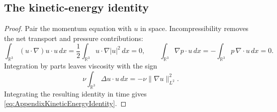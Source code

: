 \subsection{The kinetic-energy identity}

\begin{proof}
Pair the momentum equation with \(u\) in space.  Incompressibility removes
the net transport and pressure contributions:
\[
  \int_{\mathbb R^3}(u\cdot\nabla)u\cdot u\,dx
  =
  \frac12\int_{\mathbb R^3}u\cdot\nabla|u|^2\,dx
  =0,
  \qquad
  \int_{\mathbb R^3}\nabla p\cdot u\,dx
  =-
  \int_{\mathbb R^3}p\,\nabla\cdot u\,dx
  =0.
\]
Integration by parts leaves viscosity with the sign
\[
  \nu\int_{\mathbb R^3}\Delta u\cdot u\,dx
  =-\nu\lVert\nabla u\rVert_{L^2}^2.
\]
Integrating the resulting identity in time gives
\eqref{eq:AppendixKineticEnergyIdentity}.
\end{proof}
